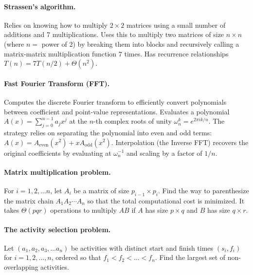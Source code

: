 \documentclass[11  pt]{exam}
\begin{document}
    \paragraph{Strassen's algorithm.} Relies on knowing how to multiply $2 \times 2$ matrices using a small number of additions and 7 multiplications. Uses this to multiply two matrices of size $n\times n$ (where $n = $ power of 2) by breaking them into blocks and recursively calling a matrix-matrix multiplication function $7$ times. Has recurrence relationships $T(n) = 7T(n/2) + \Theta(n^2)$.
    
    \paragraph{Fast Fourier Transform (FFT).} Computes the discrete Fourier transform to efficiently convert polynomials between coefficient and point-value representations. Evaluates a polynomial $A(x) = \sum_{j=0}^{n-1} a_j x^j$ at the $n$-th complex roots of unity $\omega_n^k = e^{2\pi i k / n}$. The strategy relies on separating the polynomial into even and odd terms: $A(x) = A_{\mathrm{even}}(x^2) + xA_{\mathrm{odd}}(x^2)$. Interpolation (the Inverse FFT) recovers the original coefficients by evaluating at $\omega_n^{-1}$ and scaling by a factor of $1/n$.
    
    \paragraph{Matrix multiplication problem.} 
    For $i = 1, 2, \hdots n$, let $A_i$ be a matrix of size $p_{i-1} \times p_i$. Find the way to parenthesize the matrix chain $A_1 A_2 \cdots A_n$ so that the total computational cost is minimized. It takes $\Theta(pqr)$ operations to multiply $AB$ if $A$ has size $p \times q$ and $B$ has size $q \times r$.
    
    \paragraph{The activity selection problem.} 
    Let $(a_1, a_2, a_3, \hdots a_n)$ be activities with distinct start and finish times $(s_i, f_i)$ for $i = 1,2, \hdots, n$, ordered so that $f_1 < f_2 < \hdots < f_n$. Find the largest set of non-overlapping activities. 
    
\end{document}
